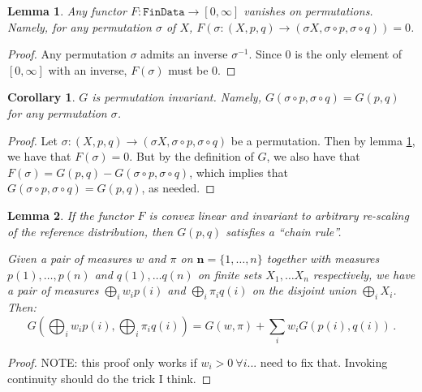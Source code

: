 \documentclass{article}
\newtheorem{lemma}{Lemma}
\newtheorem{corollary}{Corollary}
\begin{document}
{\begin{lemma} \label{vanishes_on_permutations}
    Any functor $F:\texttt{FinData}\rightarrow [0, \infty]$ vanishes on permutations. Namely, for any permutation $\sigma$ of $X$, $F(\sigma: (X, p, q) \rightarrow (\sigma X, \sigma \circ p, \sigma \circ q)) = 0$.
\end{lemma}
\begin{proof}
    Any permutation $\sigma$ admits an inverse $\sigma^{-1}$. Since $0$ is the only element of $[0, \infty]$ with an inverse, $F(\sigma)$ must be $0$.
\end{proof}
\begin{corollary}
    $G$ is permutation invariant. Namely, $G(\sigma\circ p, \sigma\circ q) = G(p, q)$ for any permutation $\sigma$.
\end{corollary}
\begin{proof}
    Let $\sigma: (X, p, q) \rightarrow (\sigma X, \sigma \circ p, \sigma \circ q)$ be a permutation. Then by lemma \ref{vanishes_on_permutations}, we have that $F(\sigma) = 0$. But by the definition of $G$, we also have that $F(\sigma) = G(p, q) - G(\sigma \circ p, \sigma \circ q)$, which implies that $G(\sigma \circ p, \sigma \circ q) = G(p, q)$, as needed.
\end{proof}

\begin{lemma}
    If the functor $F$ is convex linear and invariant to arbitrary re-scaling of the reference distribution, then $G(p, q)$ satisfies a ``chain rule''.
    
    Given a pair of measures $w$ and $\pi$ on $\mathbf{n} = \{{1, \ldots, n}\}$ together with measures $p(1), \ldots, p(n)$ and $q(1), \ldots q(n)$ on finite sets $X_1, \ldots X_n$ respectively, we have a pair of measures $\bigoplus_i w_i p(i)$ and $\bigoplus_i \pi_i q(i)$ on the disjoint union $\bigoplus_i X_i$. Then:
    \begin{equation} \label{chainrule}
        G\left(\bigoplus_i w_i p(i), \bigoplus_i \pi_i q(i)\right) = G(w, \pi) + \sum_i w_i G(p(i), q(i))\,.
    \end{equation}
\end{lemma}

\begin{proof}
    NOTE: this proof only works if $w_i > 0 \ \forall i$... need to fix that. Invoking continuity should do the trick I think.
    

\end{proof}}
\end{document}
